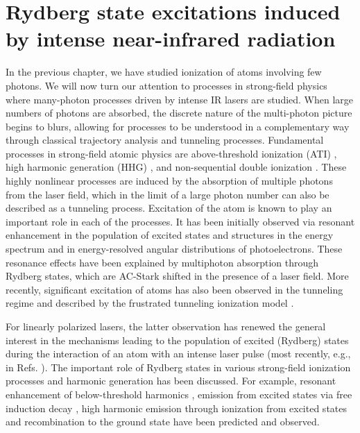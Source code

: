 \chapter{Rydberg state excitations induced by intense near-infrared radiation} %
\label{cha:rydberg_state_excitations}

In the previous chapter, we have studied ionization of atoms involving few photons. We will now turn our attention to processes in strong-field physics where many-photon processes driven by intense IR lasers are studied. When large numbers of photons are absorbed, the discrete nature of the multi-photon picture begins to blurs, allowing for processes to be understood in a complementary way through classical trajectory analysis and tunneling processes. 
Fundamental processes in strong-field atomic physics are above-threshold ionization (ATI) \cite{agostini1979}, high harmonic generation (HHG) \cite{franken1961,mcpherson1987,ferray1988}, and non-sequential double ionization \cite{walker1994}. These highly nonlinear processes are induced by the absorption of multiple photons from the laser field, which in the limit of a large photon number can also be described as a tunneling process. Excitation of the atom is known to play an important role in each of the processes. It has been initially observed via resonant enhancement in the population of excited states \cite{deboer1992,jones1992} and structures in the energy spectrum \cite{freeman1987,perry1989,agostini1989} and in energy-resolved angular distributions \cite{rottke1994} of photoelectrons. These resonance effects have been explained by multiphoton absorption through Rydberg states, which are AC-Stark shifted in the presence of a laser field. More recently, significant excitation of atoms has also been observed in the tunneling regime and described by the frustrated tunneling ionization model \cite{nubbemeyer2008}. 

For linearly polarized lasers, the latter observation has renewed the general interest in the mechanisms leading to the population of excited (Rydberg) states during the interaction of an atom with an intense laser pulse (most recently, e.g., in Refs. \cite{chini2014,li2014,li2014b,zimmermann2015,shao2015,camp2015,li2015,fechner2015,bredtmann2016,fushitani2016,lv2016,serebryannikov2016,hart2016,li2016,xiong2016,beaulieu2016,larimian2016,zimmermann2017,bengtsson2017,gao2017,ivanov2017,ilchen2017,mancuso2017,xiong2017,piraux2017}). The important role of Rydberg states in various strong-field ionization processes and harmonic generation has been discussed. For example, resonant enhancement of below-threshold harmonics \cite{toma1999,chini2014,camp2015}, emission from excited states via free induction decay \cite{camp2015,beaulieu2016}, high harmonic emission through ionization from excited states and recombination to the ground state \cite{bian2010,beaulieu2016} have been predicted and observed.

